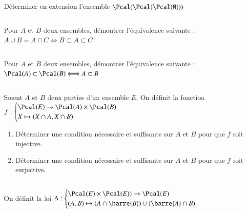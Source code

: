 \documentclass[oneside,12pt]{article}
\begin{document}
\subsection{}
Déterminer en extension l'ensemble $\Pcal(\Pcal(\Pcal(\emptyset)))$

\subsection{}
Pour $A$ et $B$ deux ensembles, démontrer l'équivalence suivante : $A\cup B = A \cap C \Longleftrightarrow B \subset A \subset C$

\subsection{}
Pour $A$ et $B$ deux ensembles, démontrer l'équivalence suivante : $\Pcal(A) \subset \Pcal(B) \Longleftrightarrow A \subset B $

\subsection{}
Soient $A$ et $B$ deux parties d'un ensemble $E$. On définit la fonction $f:\begin{cases} \Pcal(E) \to \Pcal(A) \times \Pcal(B) \\ X \mapsto \left( X \cap A , X \cap B \right) \end{cases}$
\begin{enumerate}
	\item Déterminer une condition nécessaire et suffisante sur $A$ et $B$ pour que $f$ soit injective.
	\item Déterminer une condition nécessaire et suffisante sur $A$ et $B$ pour que $f$ soit surjective.
\end{enumerate}

\subsection{}
On définit la loi $\Delta:\begin{cases} \Pcal(E)\times\Pcal(E))\to\Pcal(E) \\ (A,B) \mapsto (A \cap \barre{B}) \cup (\barre{A} \cap B) \end{cases}$
\end{document}
